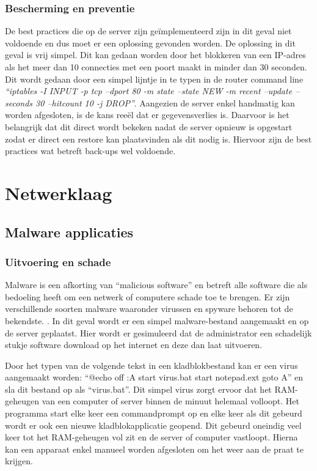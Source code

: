\documentclass[pdftex,a4paper,12pt]{report}
\begin{document}
\subsubsection{Bescherming en preventie}
De best practices die op de server zijn geïmplementeerd zijn in dit geval niet voldoende en dus moet er een oplossing gevonden worden. De oplossing in dit geval is vrij simpel. Dit kan gedaan worden door het blokkeren van een IP-adres als het meer dan 10 connecties met een poort maakt in minder dan 30 seconden. Dit wordt gedaan door een simpel lijntje in te typen in de router command line \textit{"`iptables -I INPUT -p tcp --dport 80 -m state --state NEW -m recent --update --seconds 30 --hitcount 10 -j DROP"'}. Aangezien de server enkel handmatig kan worden afgesloten, is de kans reeël dat er gegevensverlies is. Daarvoor is het belangrijk dat dit direct wordt bekeken nadat de server opnieuw is opgestart zodat er direct een restore kan plaatsvinden als dit nodig is. Hiervoor zijn de best practices wat betreft back-ups wel voldoende. 

\section{Netwerklaag}
\subsection{Malware applicaties}
\subsubsection{Uitvoering en schade}
Malware is een afkorting van "`malicious software"' en betreft alle software die als bedoeling heeft om een netwerk of computere schade toe te brengen. Er zijn verschillende soorten malware waaronder virussen en spyware behoren tot de bekendste. \citep{Moir2003}. In dit geval wordt er een simpel malware-bestand aangemaakt en op de server geplaatst. Hier wordt er gesimuleerd dat de administrator een schadelijk stukje software download op het internet en deze dan laat uitvoeren. \newline

Door het typen van de volgende tekst in een kladblokbestand kan er een virus aangemaakt worden: "`@echo off :A start virus.bat start notepad.ext goto A"' en sla dit bestand op als "`virus.bat"'. Dit simpel virus zorgt ervoor dat het RAM-geheugen van een computer of server binnen de minuut helemaal volloopt. Het programma start elke keer een commandprompt op en elke keer als dit gebeurd wordt er ook een nieuwe kladblokapplicatie geopend. Dit gebeurd oneindig veel keer tot het RAM-geheugen vol zit en de server of computer vastloopt. Hierna kan een apparaat enkel manueel worden afgesloten om het weer aan de praat te krijgen.
\end{document}
